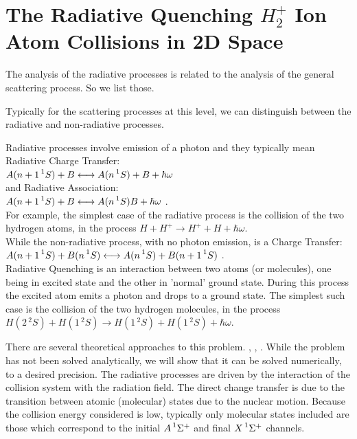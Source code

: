 \chapter{The Radiative Quenching \texorpdfstring{$ H_2^+ $}{$H_2^+$}  Ion Atom Collisions in 2D Space} 
\label{chp:quenching}

The analysis of the radiative processes is related to the analysis of the general scattering process. So we list those.

Typically for the scattering processes at this level, we can distinguish between the radiative and non-radiative processes. 

Radiative processes involve emission of a photon and they typically mean Radiative Charge Transfer: \\
$ A(n+1\prescript{1}{}S) + B \longleftrightarrow A(n\prescript{1}{}S) + B + \hbar\omega $ \\
and Radiative Association: \\
$ A(n+1\prescript{1}{}S) + B \longleftrightarrow A(n\prescript{1}{}S)B + \hbar\omega $ .\\
For example, the simplest case of the radiative process is the collision of the two hydrogen atoms, in the process $ H + H^+ \rightarrow H^+ + H + \hbar\omega $.\\

While the non-radiative process, with no photon emission, is a Charge Transfer: \\
$ A(n+1\prescript{1}{}S) + B(n\prescript{1}{}S) \longleftrightarrow  A(n\prescript{1}{}S) + B(n+1\prescript{1}{}S) $ .\\

Radiative Quenching is an interaction between two atoms (or molecules), one being in excited state and the other in 'normal' ground state. During this process the excited atom emits a photon and drops to a ground state.
The simplest such case is the collision of the two hydrogen molecules, in the process $ H(2\,{}^2\!S) + H(1\,{}^2\!S) \rightarrow H(1\,{}^2\!S) + H(1\,{}^2\!S) + \hbar\omega $.

There are several theoretical approaches to this problem. \cite{RadQuench1}, \cite{RadQuench2}, \cite{Zygelman88}. While the problem has not been solved analytically, we will show that it can be solved numerically, to a desired precision. The radiative processes are driven by the interaction of the collision system with the radiation field. The direct change transfer is due to the transition between atomic (molecular) states due to the nuclear motion. Because the collision energy considered is low, typically only molecular states included are those which correspond to the initial $ A \prescript{1}{}\Sigma^+ $  and final $ X \prescript{1}{}\Sigma^+ $ channels.

